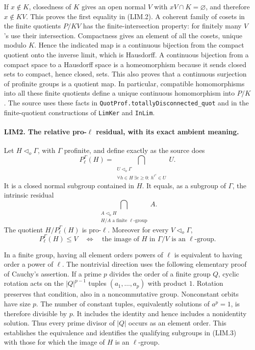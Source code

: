 If \(x\notin K\), closedness of \(K\) gives an open normal \(V\)
with \(xV\cap K=\varnothing\), and therefore \(x\notin KV\).
This proves the first equality in (LIM.2).  A coherent family of cosets
in the finite quotients \(P/KV\) has the finite-intersection property:
for finitely many \(V\)'s use their intersection.  Compactness gives an
element of all the cosets, unique modulo \(K\).  Hence the indicated map
is a continuous bijection from the compact quotient onto the inverse
limit, which is Hausdorff.  A continuous bijection from a compact space
to a Hausdorff space is a homeomorphism because it sends closed sets to
compact, hence closed, sets.  This also proves that a continuous
surjection of profinite groups is a quotient map.  In particular,
compatible homomorphisms into all these finite quotients define a
unique continuous homomorphism into \(P/K\).
The source uses these facts in \texttt{QuotProf.totallyDisconnected\_quot}
and in the finite-quotient constructions of \texttt{LimKer} and
\texttt{InLim}.

\paragraph{LIM2. The relative pro-\(\ell\) residual, with its exact ambient meaning.}
\label{claim:LIM2}
Let \(H\triangleleft_o\Gamma\), with \(\Gamma\) profinite, and define
exactly as the source does
\[
 P_\ell^\Gamma(H)=
 \bigcap_{\substack{U\triangleleft_o\Gamma\\
       \forall h\in H\ \exists e\ge0:\ h^{\ell^e}\in U}} U.
 \tag{LIM.3}
\]
It is a closed normal subgroup contained in \(H\).  It equals, as a
subgroup of \(\Gamma\), the intrinsic residual
\[
 \bigcap_{\substack{A\triangleleft_o H\\H/A\text{ a finite }\ell\text{-group}}}A.
 \tag{LIM.4}
\]
The quotient \(H/P_\ell^\Gamma(H)\) is pro-\(\ell\).  Moreover for every
\(V\triangleleft_o\Gamma\),
\[
 P_\ell^\Gamma(H)\le V
 \quad\Longleftrightarrow\quad
 \text{the image of }H\text{ in }\Gamma/V\text{ is an }\ell\text{-group}.
 \tag{LIM.5}
\]

In a finite group, having all element orders powers of \(\ell\) is
equivalent to having order a power of \(\ell\).  The nontrivial direction
uses the following elementary proof of Cauchy's assertion.  If a prime
\(p\) divides the order of a finite group \(Q\), cyclic rotation acts on
the \(|Q|^{p-1}\) tuples \((a_1,\ldots,a_p)\) with product \(1\).
Rotation preserves that condition, also in a noncommutative group.
Nonconstant orbits have size \(p\).  The number of constant tuples,
equivalently solutions of \(a^p=1\), is therefore divisible by \(p\).
It includes the identity and hence includes a nonidentity solution.
Thus every prime divisor of \(|Q|\) occurs as an element order.
This establishes the equivalence and identifies the qualifying
subgroups in (LIM.3) with those for which the image of \(H\) is an
\(\ell\)-group.

